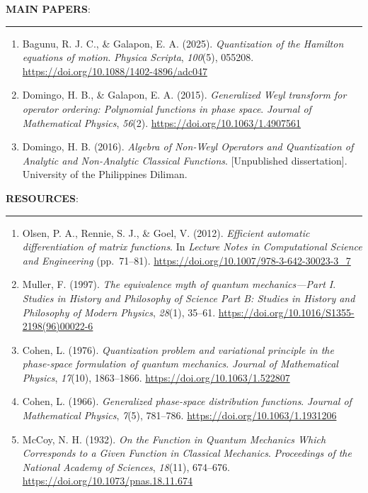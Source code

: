 {\noindent\textbf{MAIN PAPERS}:\\
\hrule
\begin{enumerate}
	\item Bagunu, R. J. C., \& Galapon, E. A. (2025). \textit{Quantization of the Hamilton equations of motion}. \textit{Physica Scripta}, \textit{100}(5), 055208. \url{https://doi.org/10.1088/1402-4896/adc047}
	
	\item Domingo, H. B., \& Galapon, E. A. (2015). \textit{Generalized Weyl transform for operator ordering: Polynomial functions in phase space}. \textit{Journal of Mathematical Physics}, \textit{56}(2). \url{https://doi.org/10.1063/1.4907561}
	
	\item Domingo, H. B. (2016). \textit{Algebra of Non-Weyl Operators and Quantization of Analytic and Non-Analytic Classical Functions}. [Unpublished dissertation]. University of the Philippines Diliman.
\end{enumerate}	

\noindent\textbf{RESOURCES}: \\
\hrule	
	\begin{enumerate}
		\item Olsen, P. A., Rennie, S. J., \& Goel, V. (2012). \textit{Efficient automatic differentiation of matrix functions}. In \textit{Lecture Notes in Computational Science and Engineering} (pp.~71--81). \url{https://doi.org/10.1007/978-3-642-30023-3_7}
		
		\item Muller, F. (1997). \textit{The equivalence myth of quantum mechanics---Part I}. \textit{Studies in History and Philosophy of Science Part B: Studies in History and Philosophy of Modern Physics}, \textit{28}(1), 35--61. \url{https://doi.org/10.1016/S1355-2198(96)00022-6}
		
		\item Cohen, L. (1976). \textit{Quantization problem and variational principle in the phase-space formulation of quantum mechanics}. \textit{Journal of Mathematical Physics}, \textit{17}(10), 1863--1866. \url{https://doi.org/10.1063/1.522807}
		
		\item Cohen, L. (1966). \textit{Generalized phase-space distribution functions}. \textit{Journal of Mathematical Physics}, \textit{7}(5), 781--786. \url{https://doi.org/10.1063/1.1931206}
		
		\item McCoy, N. H. (1932). \textit{On the Function in Quantum Mechanics Which Corresponds to a Given Function in Classical Mechanics}. \textit{Proceedings of the National Academy of Sciences}, \textit{18}(11), 674--676. \url{https://doi.org/10.1073/pnas.18.11.674}
		

\end{enumerate}}
